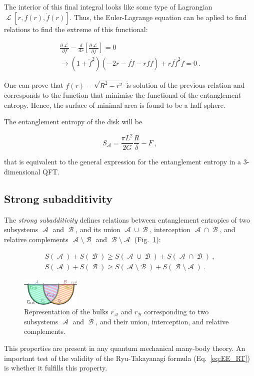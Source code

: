 \documentclass[twocolumn]{revtex4}
\providecommand{\eq}[2]{
    \begin{equation}
        #2
    \label{eq:#1}
    \end{equation}
}
\providecommand{\eqgat}[2]{
    \begin{gather}
        #2
    \label{eq:#1}
    \end{gather}
}
\DeclareMathOperator{\calA}{\mathcal{A}}
\DeclareMathOperator{\calB}{\mathcal{B}}
\DeclareMathOperator{\calL}{\mathcal{L}}
\begin{document}
The interior of this final integral looks like some type of Lagrangian $\calL [r,f(r),\dot{f}(r)]$. Thus, the Euler-Lagrange equation can be aplied to find relations to find the extreme of this functional:
\eqgat{1EL}{
    \frac{\partial \calL}{\partial f} - \frac{d}{dr} \left[ \frac{\partial \calL}{\partial \dot{f}} \right] = 0 \nonumber \\
    \longrightarrow \left( 1+\dot{f}^2 \right) \left( -2r-f\dot{f}-rf\ddot{f} \right) + rf\dot{f}^2\ddot{f} = 0 \ .
}

One can prove that $f(r) = \sqrt{R^2 - r^2}$ is solution of the previous relation and corresponds to the function that minimise the functional of the entanglement entropy. Hence, the surface of minimal area is found to be a half sphere.

The entanglement entropy of the disk will be
\eq{1sol}{
    S_{\calA} = \frac{\pi L^2}{2G} \frac{R}{\delta} - F \ ,
}
that is equivalent to the general expression for the entanglement entropy in a 3-dimensional QFT.


\subsection{Strong subadditivity} \label{ss:SS}

The \textit{strong subadditivity} \cite{headrick_holographic_2007} defines relations between entanglement entropies of two subsystems $\calA$ and $\calB$, and its union $\calA \cup \calB$, interception $\calA \cap \calB$, and relative complements $\calA \setminus \calB$ and $\calB \setminus \calA$ (Fig.~\ref{fig:SS}):
\eqgat{EE_strong-subadd}{
    S(\calA) + S(\calB) \ge S(\calA \cup \calB) + S(\calA \cap \calB) \ , \nonumber \\
    S(\calA) + S(\calB) \ge S(\calA \setminus \calB) + S(\calB \setminus \calA) \ .
}

\begin{figure}
    \centering
    \includegraphics[width=0.25\textwidth]{../Imatges/SS_D.png}
\caption{Representation of the bulks $r_{\calA}$ and $r_{\calB}$ corresponding to two subsystems $\calA$ and $\calB$, and their union, interception, and relative complements.}
\label{fig:SS}
\end{figure}

This properties are present in any quantum mechanical many-body theory. An important test of the validity of the Ryu-Takayanagi formula (Eq.~\ref{eq:EE_RT}) is whether it fulfills this property.
\end{document}
